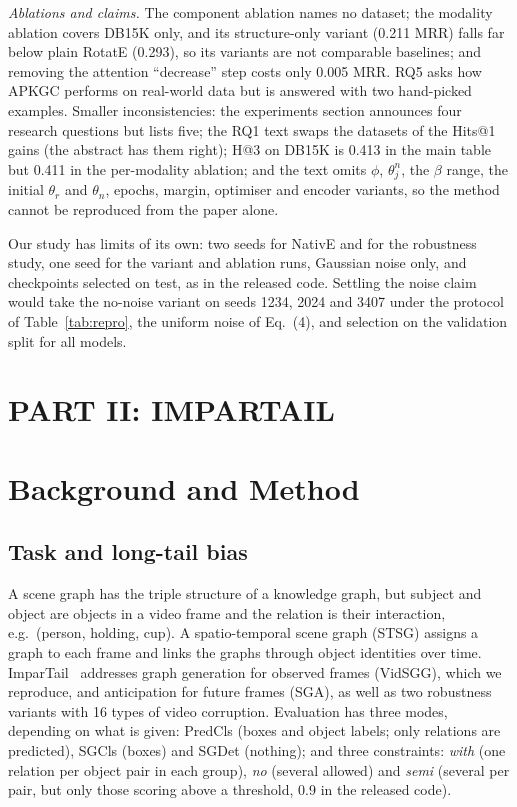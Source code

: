 \documentclass[conference,a4paper]{IEEEtran}
\begin{document}
\emph{Ablations and claims.} The component ablation names no dataset; the modality ablation
covers DB15K only, and its structure-only variant (0.211 MRR) falls far below plain RotatE
(0.293), so its variants are not comparable baselines; and removing the attention
``decrease'' step costs only 0.005 MRR. RQ5 asks how APKGC performs on real-world data but
is answered with two hand-picked examples. Smaller inconsistencies: the experiments section
announces four research questions but lists five; the RQ1 text swaps the datasets of the
Hits@1 gains (the abstract has them right); H@3 on DB15K is 0.413 in the main table but
0.411 in the per-modality ablation; and the text omits $\phi$, $\theta^n_j$, the $\beta$
range, the initial $\theta_r$ and $\theta_n$, epochs, margin, optimiser and encoder
variants, so the method cannot be reproduced from the paper alone.

Our study has limits of its own: two seeds for NativE and for the robustness study, one
seed for the variant and ablation runs, Gaussian noise only, and checkpoints selected on
test, as in the released code. Settling the noise claim would take the no-noise variant on
seeds 1234, 2024 and 3407 under the protocol of Table~\ref{tab:repro}, the uniform noise of
Eq.~(4), and selection on the validation split for all models.

\section*{PART II: IMPARTAIL}

\section{Background and Method}
\subsection{Task and long-tail bias}
A scene graph has the triple structure of a knowledge graph, but subject and object are
objects in a video frame and the relation is their interaction, e.g.\ (person, holding,
cup). A spatio-temporal scene graph (STSG) assigns a graph to each frame and links the
graphs through object identities over time. ImparTail~\cite{impartail} addresses graph
generation for observed frames (VidSGG), which we reproduce, and anticipation for future
frames (SGA), as well as two robustness variants with 16 types of video corruption.
Evaluation has three modes, depending on what is given: PredCls (boxes and object labels;
only relations are predicted), SGCls (boxes) and SGDet (nothing); and three constraints:
\emph{with} (one relation per object pair in each group), \emph{no} (several allowed) and
\emph{semi} (several per pair, but only those scoring above a threshold, 0.9 in the
released code).
\end{document}
